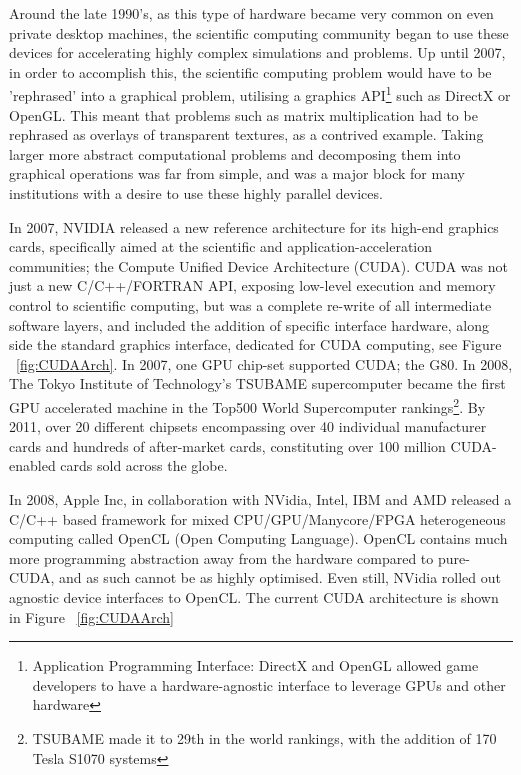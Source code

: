 Around the late 1990's, as this type of hardware became very common on even private desktop machines, the scientific computing community began to use these devices for accelerating highly complex simulations and problems. Up until 2007, in order to accomplish this, the scientific computing problem would have to be 'rephrased' into a graphical problem, utilising a graphics API\footnote{Application Programming Interface: DirectX and OpenGL allowed game developers to have a hardware-agnostic interface to leverage GPUs and other hardware} such as DirectX or OpenGL. This meant that problems such as matrix multiplication had to be rephrased as overlays of transparent textures, as a contrived example. Taking larger more abstract computational problems and decomposing them into graphical operations was far from simple, and was a major block for many institutions with a desire to use these highly parallel devices.

In 2007, NVIDIA released a new reference architecture for its high-end graphics cards, specifically aimed at the scientific and application-acceleration communities; the Compute Unified Device Architecture (CUDA)\cite{NC07}. CUDA was not just a new C/C++/FORTRAN API, exposing low-level execution and memory control to scientific computing, but was a complete re-write of all intermediate software layers, and included the addition of specific interface hardware, along side the standard graphics interface, dedicated for CUDA computing\cite{DBK10}, see Figure ~\ref{fig:CUDAArch}. In 2007, one GPU chip-set supported CUDA; the G80. In 2008, The Tokyo Institute of Technology's TSUBAME supercomputer became the first GPU accelerated machine in the Top500 World Supercomputer rankings\footnote{TSUBAME made it to 29th in the world rankings, with the addition of 170 Tesla S1070 systems\cite{Hum08}}. By 2011, over 20 different chipsets encompassing over 40 individual manufacturer cards and hundreds of after-market cards, constituting over 100 million CUDA-enabled cards\cite{iVE10} sold across the globe.

In 2008, Apple Inc, in collaboration with NVidia, Intel, IBM and AMD released a C/C++ based framework for mixed CPU/GPU/Manycore/FPGA heterogeneous computing called OpenCL (Open Computing Language). OpenCL contains much more programming abstraction away from the hardware compared to pure-CUDA, and as such cannot be as highly optimised. Even still, NVidia rolled out agnostic device interfaces to OpenCL. The current CUDA architecture is shown in Figure ~\ref{fig:CUDAArch}

